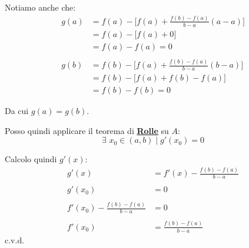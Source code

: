 \documentclass[../dimostrazioni]{subfiles}
\begin{document}
            Notiamo anche che:
            \begin{align*}
                g(a) &= f(a) - \bigg[f(a) + \frac{f(b) - f(a)}{b - a}(a - a) \bigg]\\
                     &= f(a) - \bigg[f(a) + 0 \bigg]\\
                     &= f(a) - f(a) = 0\\
                     \\
                g(b) &= f(b) - \bigg[f(a) + \frac{f(b) - f(a)}{b - a}(b - a) \bigg]\\
                     &= f(b) - \bigg[f(a) + f(b) - f(a) \bigg]\\
                     &= f(b) - f(b) = 0
            \end{align*}
            
            Da cui \( g(a) = g(b) \).

            Posso quindi applicare il teorema di \textbf{\hyperref[teoRolle]{Rolle}} su \( A \):
            \[
                \exists \, \, x_0 \in (a,b) \; | \; g'(x_0) = 0
            \]
            
            Calcolo quindi \( g'(x) \):
            \begin{align*}
                g'(x) &= f'(x) - \frac{f(b) - f(a)}{b-a}\\
                \\
                g'(x_0) &= 0 \\
                \\
                f'(x_0) - \frac{f(b) - f(a)}{b-a} &= 0\\
                \\
                f'(x_0) &= \frac{f(b) - f(a)}{b-a}
            \end{align*} c.v.d.
            
    
\end{document}
